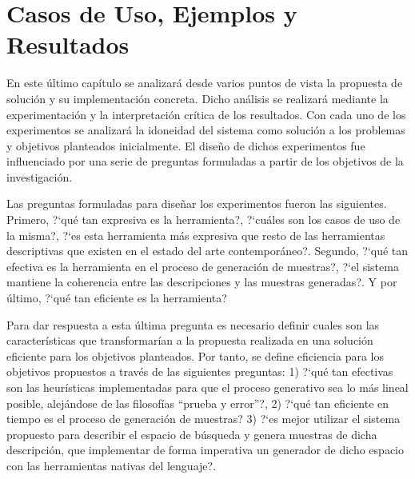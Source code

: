 \chapter{Casos de Uso, Ejemplos y Resultados}\label{chapter:implementation}

En este último capítulo se analizará desde varios puntos de vista
la propuesta de solución y su implementación concreta. Dicho análisis 
se realizará mediante la experimentación y la interpretación crítica de 
los resultados. Con cada uno de los experimentos se analizará la idoneidad
del sistema como solución a los problemas y objetivos planteados inicialmente. 
El diseño de dichos experimentos fue influenciado por una serie de preguntas 
formuladas a partir de los objetivos de la investigación.

Las preguntas formuladas para diseñar los experimentos fueron las siguientes. 
Primero, ?`qué tan expresiva es la herramienta?, ?`cuáles son los
casos de uso de la misma?, ?`es esta herramienta más expresiva que resto de las 
herramientas descriptivas que existen en el estado del arte contemporáneo?. 
Segundo, ?`qué tan efectiva es la herramienta en el proceso de generación de muestras?, 
?`el sistema mantiene la coherencia entre las descripciones
y las muestras generadas?. Y por último, ?`qué tan eficiente es la herramienta?

Para dar respuesta a esta última pregunta es necesario definir cuales son las características
que transformarían a la propuesta realizada en una solución eficiente para los objetivos
planteados. Por tanto, se define eficiencia para los objetivos propuestos a través de las siguientes preguntas: 
1) ?`qué tan efectivas son las heurísticas implementadas para que el proceso generativo sea lo más lineal
posible, alejándose de las filosofías ``prueba y error''?, 2) ?`qué tan eficiente en tiempo es el
proceso de generación de muestras? 3) ?`es mejor utilizar el sistema propuesto para describir el
espacio de búsqueda y genera muestras de dicha descripción, que implementar de forma imperativa
un generador de dicho espacio con las herramientas nativas del lenguaje?.

